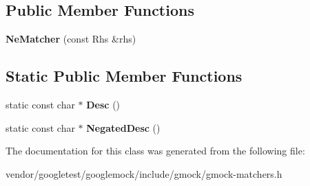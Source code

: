 \subsection*{Public Member Functions}
\begin{DoxyCompactItemize}
\item 
{\bfseries Ne\+Matcher} (const Rhs \&rhs)\hypertarget{classtesting_1_1internal_1_1NeMatcher_a64842882811cc96624c87119c51edd3e}{}\label{classtesting_1_1internal_1_1NeMatcher_a64842882811cc96624c87119c51edd3e}

\end{DoxyCompactItemize}
\subsection*{Static Public Member Functions}
\begin{DoxyCompactItemize}
\item 
static const char $\ast$ {\bfseries Desc} ()\hypertarget{classtesting_1_1internal_1_1NeMatcher_a2ec33febe5471f9d435b4dc9f5cda564}{}\label{classtesting_1_1internal_1_1NeMatcher_a2ec33febe5471f9d435b4dc9f5cda564}

\item 
static const char $\ast$ {\bfseries Negated\+Desc} ()\hypertarget{classtesting_1_1internal_1_1NeMatcher_a9ea152391b69d422ba2a88c3d2d2dae5}{}\label{classtesting_1_1internal_1_1NeMatcher_a9ea152391b69d422ba2a88c3d2d2dae5}

\end{DoxyCompactItemize}


The documentation for this class was generated from the following file\+:\begin{DoxyCompactItemize}
\item 
vendor/googletest/googlemock/include/gmock/gmock-\/matchers.\+h\end{DoxyCompactItemize}
